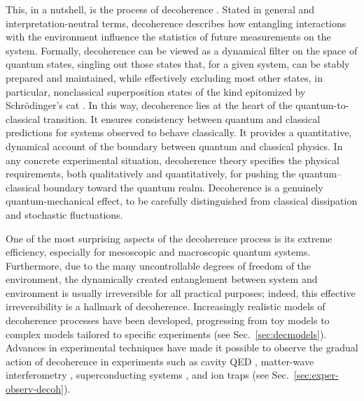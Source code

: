 \documentclass[3p,sort&compress]{elsarticle}
\begin{document}
This, in a nutshell, is the process of decoherence \cite{Zeh:1970:yt,Zurek:1981:dd,Zurek:1982:tv,Paz:2001:aa,Zurek:2002:ii,Schlosshauer:2003:tv,Bacciagaluppi:2003:yz,Joos:2003:jh,Schlosshauer:2007:un}. Stated in general and interpretation-neutral terms, decoherence describes how entangling interactions with the environment influence the statistics of future measurements on the system. Formally, decoherence can be viewed as a dynamical filter on the space of quantum states, singling out those states that, for a given system, can be stably prepared and maintained, while effectively excluding most other states, in particular, nonclassical superposition states of the kind epitomized by Schr\"odinger's cat \cite{Schrodinger:1935:gs}. In this way, decoherence lies at the heart of the quantum-to-classical transition. It ensures consistency between quantum and classical predictions for systems observed to behave classically. It provides a quantitative, dynamical account of the boundary between quantum and classical physics. In any concrete experimental situation, decoherence theory specifies the physical requirements, both qualitatively and quantitatively, for pushing the quantum--classical boundary toward the quantum realm. Decoherence is a genuinely quantum-mechanical effect, to be carefully distinguished from classical dissipation and stochastic fluctuations.

One of the most surprising aspects of the decoherence process is its extreme efficiency, especially for mesoscopic and macroscopic quantum systems. Furthermore, due to the many uncontrollable degrees of freedom of the environment, the dynamically created entanglement between system and environment is usually irreversible for all practical purposes; indeed, this effective irreversibility is a hallmark of decoherence. Increasingly realistic models of decoherence processes have been developed, progressing from toy models to complex models tailored to specific experiments (see Sec.~\ref{sec:decmodels}). Advances in experimental techniques have made it possible to observe the gradual action of decoherence in experiments such as cavity QED \cite{Raimond:2001:aa}, matter-wave interferometry \cite{Hornberger:2012:ii}, superconducting systems \cite{Leggett:2002:uy}, and ion traps \cite{Leibfried:2003:om,Haffner:2008:pp} (see Sec.~\ref{sec:exper-observ-decoh}). 
\end{document}
